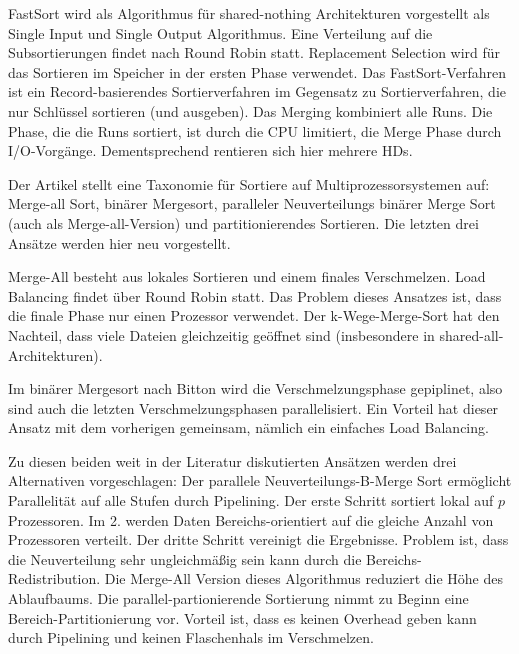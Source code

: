 \documentclass[a4paper,12pt,twoside]{article}
\begin{document}
\textbf{}

FastSort wird als Algorithmus für shared-nothing Architekturen vorgestellt als Single Input und Single Output Algorithmus. Eine Verteilung auf die Subsortierungen findet nach Round Robin statt. Replacement Selection wird für das Sortieren im Speicher in der ersten Phase verwendet. Das FastSort-Verfahren ist ein Record-basierendes Sortierverfahren im Gegensatz zu Sortierverfahren, die nur Schlüssel sortieren (und ausgeben). Das Merging kombiniert alle Runs. Die Phase, die die Runs sortiert, ist durch die CPU limitiert, die Merge Phase durch I/O-Vorgänge. Dementsprechend rentieren sich hier mehrere HDs. 

\textbf{}

Der Artikel stellt eine Taxonomie für Sortiere auf Multiprozessorsystemen auf: Merge-all Sort, binärer Mergesort, paralleler Neuverteilungs binärer Merge Sort (auch als Merge-all-Version) und partitionierendes Sortieren. Die letzten drei Ansätze werden hier neu vorgestellt.

Merge-All besteht aus lokales Sortieren und einem finales Verschmelzen. Load Balancing findet über Round Robin statt. Das Problem dieses Ansatzes ist, dass die finale Phase nur einen Prozessor verwendet. Der k-Wege-Merge-Sort hat den Nachteil, dass viele Dateien gleichzeitig geöffnet sind (insbesondere in shared-all-Architekturen).

Im binärer Mergesort nach Bitton wird die Verschmelzungsphase gepiplinet, also sind auch die letzten Verschmelzungsphasen parallelisiert. Ein Vorteil hat dieser Ansatz mit dem vorherigen gemeinsam, nämlich ein einfaches Load Balancing.

Zu diesen beiden weit in der Literatur diskutierten Ansätzen werden drei Alternativen vorgeschlagen: Der parallele Neuverteilungs-B-Merge Sort ermöglicht Parallelität auf alle Stufen durch Pipelining. Der erste Schritt sortiert lokal auf $p$ Prozessoren. Im 2. werden Daten Bereichs-orientiert auf die gleiche Anzahl von Prozessoren verteilt. Der dritte Schritt vereinigt die Ergebnisse. Problem ist, dass die Neuverteilung sehr ungleichmäßig sein kann durch die Bereichs-Redistribution. Die Merge-All Version dieses Algorithmus reduziert die Höhe des Ablaufbaums. Die parallel-partionierende Sortierung nimmt zu Beginn eine Bereich-Partitionierung vor. Vorteil ist, dass es keinen Overhead geben kann durch Pipelining und keinen Flaschenhals im Verschmelzen.

\textbf{}
\end{document}
